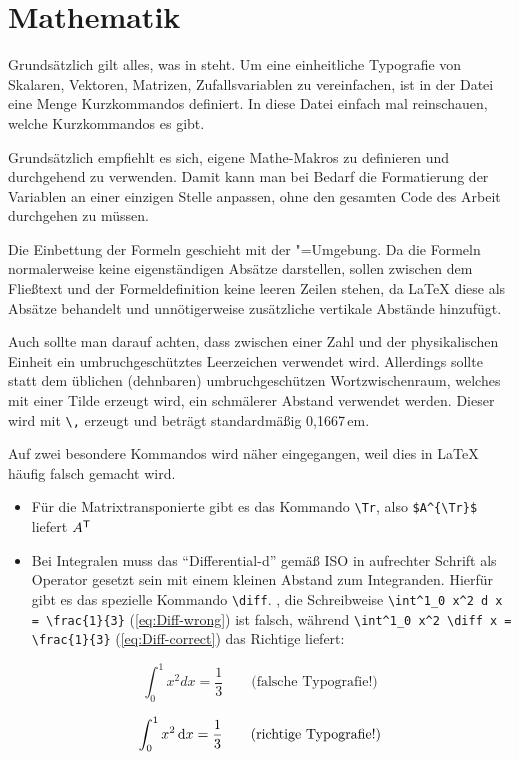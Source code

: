 \section{Mathematik}%
\label{sec:Mathe}
%
Grundsätzlich gilt alles, was in \parencites{ams1999a}{ams1999b} steht. 
Um eine einheitliche Typografie von
Skalaren, Vektoren, Matrizen,
Zufallsvariablen \etc zu vereinfachen, ist in der Datei
 eine Menge Kurzkommandos definiert.
In diese Datei einfach mal reinschauen, welche Kurzkommandos es gibt.

Grundsätzlich empfiehlt es sich, eigene Mathe-Makros zu definieren und durchgehend zu verwenden.
Damit kann man bei Bedarf die Formatierung der Variablen an einer einzigen Stelle anpassen,
ohne den gesamten Code des Arbeit durchgehen zu müssen.

Die Einbettung der Formeln geschieht mit der "=Umgebung.
Da die Formeln normalerweise keine eigenständigen Absätze darstellen,
sollen zwischen dem Fließtext und der Formeldefinition keine leeren Zeilen stehen,
da \LaTeX{} diese als Absätze behandelt und unnötigerweise zusätzliche vertikale Abstände hinzufügt.

Auch sollte man darauf achten, dass zwischen einer Zahl und der physikalischen Einheit ein umbruchgeschütztes Leerzeichen verwendet wird.
Allerdings sollte statt dem üblichen (dehnbaren) umbruchgeschützen Wortzwischenraum, 
welches mit einer Tilde erzeugt wird, ein schmälerer Abstand verwendet werden.
Dieser wird mit \verb+\,+  erzeugt und beträgt standardmäßig 0,1667\,em. %
%

Auf zwei besondere Kommandos wird näher eingegangen,
weil dies in \LaTeX{} häufig falsch gemacht wird.
\begin{itemize}
  \item Für die Matrixtransponierte gibt es das Kommando \verb#\Tr#, also
	\verb#$A^{\Tr}$# liefert $A^{\mathsf{T}}$	
	\item \justifying Bei Integralen muss das \enquote{Differential-d} gemäß
	ISO in aufrechter Schrift als Operator gesetzt sein mit einem kleinen Abstand
	zum Integranden. Hierfür gibt es das spezielle Kommando \verb#\diff#.
	\Dhe, die Schreibweise \verb#\int^1_0 x^2 d x = \frac{1}{3}# (\cref{eq:Diff-wrong}) ist falsch,
	während \verb#\int^1_0 x^2 \diff x = \frac{1}{3}# (\cref{eq:Diff-correct}) das Richtige liefert:
\end{itemize}

\begin{equation}
	\int^1_0 x^2 d x = \frac{1}{3} \qquad \text{(falsche Typografie!)}
	\label{eq:Diff-wrong}
\end{equation}

\begin{equation}
	\int^1_0 x^2 \mathop{}\!\mathrm{d} x = \frac{1}{3} \qquad \text{(richtige Typografie!)}
	\label{eq:Diff-correct}
\end{equation}

